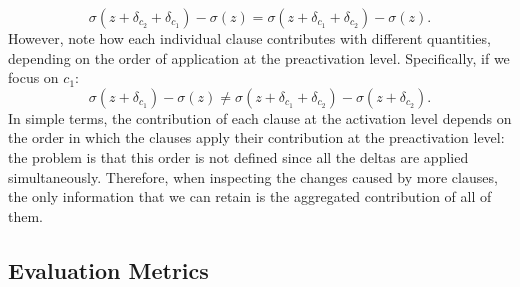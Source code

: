 \begin{equation*}
\sigma(z + \delta_{c_2} + \delta_{c_1}) - \sigma(z) = \sigma(z + \delta_{c_1} + \delta_{c_2}) - \sigma(z).
\end{equation*}
However, note how each individual clause contributes with different quantities, depending on the order of application at the preactivation level. Specifically, if we focus on $c_1$:
\begin{equation*}
\sigma(z + \delta_{c_1}) - \sigma(z) \neq \sigma(z + \delta_{c_1} + \delta_{c_2}) - \sigma(z + \delta_{c_2}).
\end{equation*}
In simple terms, the contribution of each clause at the activation level depends on the order in which the clauses apply their contribution at the preactivation level: the problem is that this order is not defined since all the deltas are applied simultaneously. Therefore, when inspecting the changes caused by more clauses, the only information that we can retain is the aggregated contribution of all of them.

\subsection{Evaluation Metrics}

